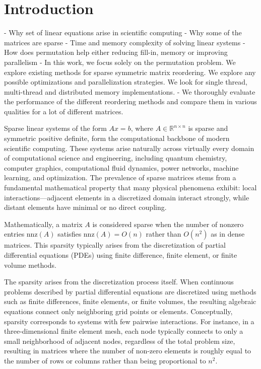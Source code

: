 \chapter{Introduction}
\label{ch:introduction}


- Why set of linear equations arise in scientific computing
- Why some of the matrices are sparse
- Time and memory complexity of solving linear systems
- How does permutation help either reducing fill-in, memory or improving parallelism
- In this work, we focus solely on the permutation problem. We explore existing methods for sparse symmetric matrix reordering. We explore any possible optimizations and parallelization strategies. We look for single thread, multi-thread and distributed memory implementations.
- We thoroughly evaluate the performance of the different reordering methods and compare them in various qualities for a lot of different matrices.

Sparse linear systems of the form $Ax = b$, where $A \in \mathbb{R}^{n \times n}$ is sparse and symmetric positive definite, form the computational backbone of modern scientific computing. These systems arise naturally across virtually every domain of computational science and engineering, including quantum chemistry, computer graphics, computational fluid dynamics, power networks, machine learning, and optimization. The prevalence of sparse matrices stems from a fundamental mathematical property that many physical phenomena exhibit: local interactions—adjacent elements in a discretized domain interact strongly, while distant elements have minimal or no direct coupling.

Mathematically, a matrix $A$ is considered sparse when the number of nonzero entries $\text{nnz}(A)$ satisfies $\text{nnz}(A) = O(n)$ rather than $O(n^2)$ as in dense matrices. This sparsity typically arises from the discretization of partial differential equations (PDEs) using finite difference, finite element, or finite volume methods. 

The sparsity arises from the discretization process itself. When continuous problems described by partial differential equations are discretized using methods such as finite differences, finite elements, or finite volumes, the resulting algebraic equations connect only neighboring grid points or elements. Conceptually, sparsity corresponds to systems with few pairwise interactions. For instance, in a three-dimensional finite element mesh, each node typically connects to only a small neighborhood of adjacent nodes, regardless of the total problem size, resulting in matrices where the number of non-zero elements is roughly equal to the number of rows or columns rather than being proportional to $n^2$.

